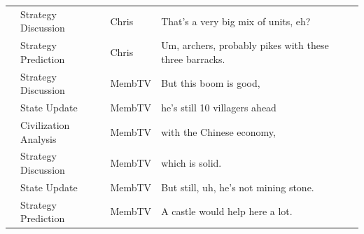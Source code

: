 {\begin{longtable}{@{}>{\theAppRow}r|L{2.3cm}L{1.0cm}U{11.55cm}@{}}
    & Strategy Discussion   & Chris        & That's a very big mix of units, eh?                                                                                                                                                                                                                              \\
    & Strategy Prediction   & Chris        & Um, archers, probably pikes with these three barracks.                                                                                                                                                                                                           \\
    & Strategy Discussion   & MembTV       & But this boom is good,                                                                                                                                                                                                                                           \\
    & State Update          & MembTV       & he's still 10 villagers ahead                                                                                                                                                                                                                                    \\
    & Civilization Analysis & MembTV       & with the Chinese economy,                                                                                                                                                                                                                                        \\
    & Strategy Discussion   & MembTV       & which is solid.                                                                                                                                                                                                                                                  \\
    & State Update          & MembTV       & But still, uh, he's not mining stone.                                                                                                                                                                                                                            \\
    & Strategy Prediction   & MembTV       & A castle would help here a lot.                                                                                                                                                                                                                                  \\

\end{longtable}}
